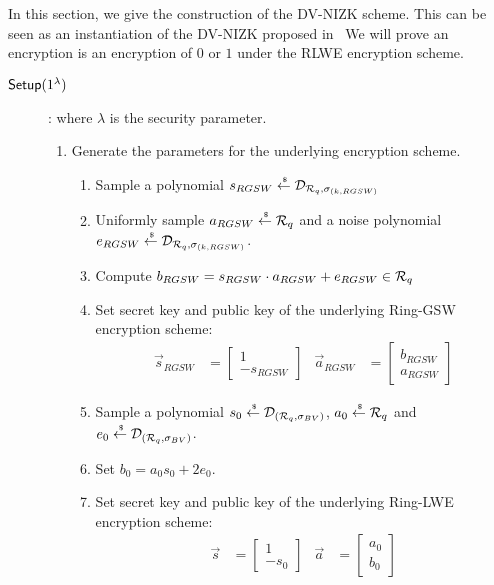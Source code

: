 In this section, we give the construction of the DV-NIZK scheme.
This can be seen as an instantiation of the DV-NIZK proposed in~\cite{DBLP:conf/pkc/ChaidosG15}
We will prove an encryption is an encryption of $0$ or $1$ under the RLWE encryption scheme.

\begin{description}
\item[${\mathsf{Setup}}(1^\lambda)$]: where $\lambda$ is the security parameter.
  \begin{enumerate}
    \item Generate the parameters for the underlying encryption scheme.
      \begin{enumerate}
      \item Sample a polynomial $s_{RGSW} \stackrel{{\scriptscriptstyle \mkern4mu \$}}{\gets} \mathcal{D}_{{\mathcal{R}}_q, \sigma_{(k,RGSW)}}$
      \item Uniformly sample $a_{RGSW} \stackrel{{\scriptscriptstyle \mkern4mu \$}}{\gets} {\mathcal{R}}_q$ and a noise polynomial $e_{RGSW} \stackrel{{\scriptscriptstyle \mkern4mu \$}}{\gets} \mathcal{D}_{{\mathcal{R}}_q, \sigma_{(k, RGSW)}}$.
      \item Compute $b_{RGSW} = s_{RGSW} \cdot a_{RGSW} + e_{RGSW} \in {\mathcal{R}}_q$
      \item Set secret key and public key of the underlying Ring-GSW encryption scheme:
        \begin{align*}
          \vec{s}_{RGSW} &= \begin{bmatrix} 1 \\ -s_{RGSW} \end{bmatrix}  & \vec{a}_{RGSW} &=  \begin{bmatrix} b_{RGSW} \\ a_{RGSW}\end{bmatrix}
        \end{align*}
      \item Sample a polynomial $s_0 \stackrel{{\scriptscriptstyle \mkern4mu \$}}{\gets} \mathcal{D}_{({\mathcal{R}}_q, \sigma_{BV})}$, $a_0 \stackrel{{\scriptscriptstyle \mkern4mu \$}}{\gets} {\mathcal{R}}_q$ and $e_0 \stackrel{{\scriptscriptstyle \mkern4mu \$}}{\gets} \mathcal{D}_{({\mathcal{R}}_q, \sigma_{BV})}$.
      \item Set $b_0 = a_0 s_0 + 2 e_0$.
      \item Set secret key and public key of the underlying Ring-LWE encryption scheme:
        \begin{align*}
          \vec{s} &= \begin{bmatrix} 1 \\ -s_0\end{bmatrix} & \vec{a} &= \begin{bmatrix} a_0 \\ b_0\end{bmatrix}

\end{align*}
\end{enumerate}
\end{enumerate}
\end{description}
